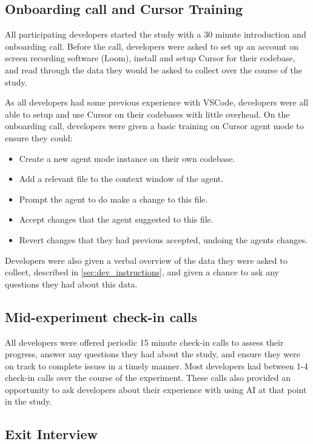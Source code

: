 \documentclass{article}
\begin{document}
\subsection{Onboarding call and Cursor Training}
\label{sec:cursor_training}

All participating developers started the study with a 30 minute introduction and onboarding call. Before the call, developers were asked to set up an account on screen recording software (Loom), install and setup Cursor for their codebase, and read through the data they would be asked to collect over the course of the study.

As all developers had some previous experience with VSCode, developers were all able to setup and use Cursor on their codebases with little overhead. On the onboarding call, developers were given a basic training on Cursor agent mode to ensure they could:
\begin{itemize}
    \item Create a new agent mode instance on their own codebase.
    \item Add a relevant file to the context window of the agent.
    \item Prompt the agent to do make a change to this file. 
    \item Accept changes that the agent suggested to this file.
    \item Revert changes that they had previous accepted, undoing the agents changes.
\end{itemize}

Developers were also given a verbal overview of the data they were asked to collect, described in \autoref{sec:dev_instructions}, and given a chance to ask any questions they had about this data.

\subsection{Mid-experiment check-in calls}

All developers were offered periodic 15 minute check-in calls to assess their progress, answer any questions they had about the study, and ensure they were on track to complete issues in a timely manner. Most developers had between 1-4 check-in calls over the course of the experiment.  These calls also provided an opportunity to ask developers about their experience with using AI at that point in the study.

\subsection{Exit Interview}
\end{document}
